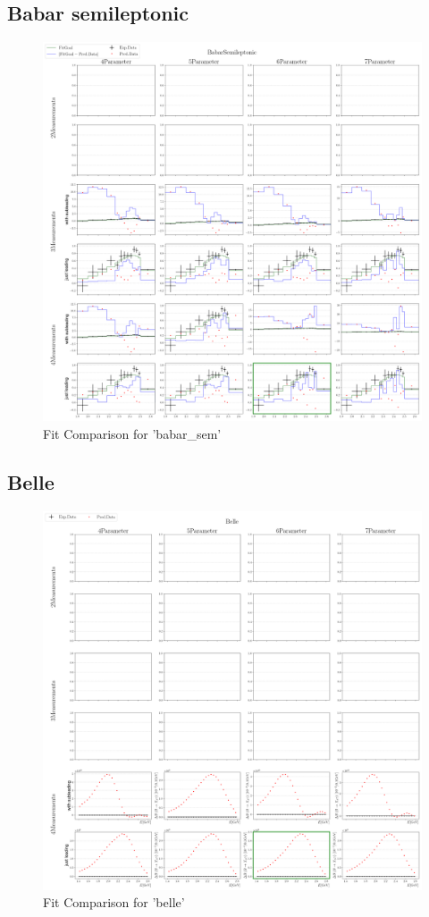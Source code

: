 \documentclass[a4paper,12pt]{article}
\begin{document}
\subsection{Babar semileptonic}
\begin{figure}[H]
    \centering
    \includegraphics[scale=0.3]{../compare/babar_sem_soft_compare.png}
    \caption{Fit Comparison for 'babar\_sem'}
\end{figure}
\subsection{Belle}
\begin{figure}[H]
    \centering
    \includegraphics[scale=0.3]{../compare/belle_soft_compare.png}
    \caption{Fit Comparison for 'belle'}
\end{figure}
\end{document}
